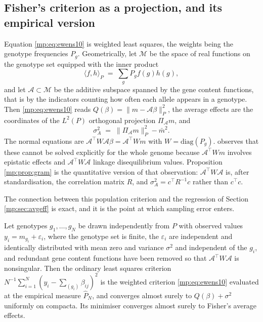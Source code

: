 \subsection{Fisher's criterion as a projection, and its empirical version}

Equation \eqref{mp:eq:ewens10} is weighted least squares, the weights being the genotype
frequencies $P_g$. Geometrically, let $\mathcal{M}$ be the space
of real functions on the genotype set equipped with the inner product
\[
\langle f,h\rangle_P \;=\; \sum_g P_g f(g) h(g),
\]
and let $\mathcal{A}\subset\mathcal{M}$ be the additive subspace spanned by the gene content
functions, that is by the indicators counting how often each allele appears in a genotype.
Then \eqref{mp:eq:ewens10} reads $Q(\beta)=\|m-\mathcal{A}\beta\|_P^2$, the average effects are
the coordinates of the $L^2(P)$ orthogonal projection $\Pi_{\mathcal{A}}m$, and
\[
\sigma_A^2 \;=\; \|\Pi_{\mathcal{A}} m\|_P^2 - \bar m^2 .
\]
The normal equations are $\mathcal{A}^\top W\mathcal{A}\beta = \mathcal{A}^\top W m$ with
$W=\mathrm{diag}(P_g)$. \citet{mp:ewens2024} observes that these cannot be solved explicitly for the
whole genome because $\mathcal{A}^\top Wm$ involves epistatic effects and $\mathcal{A}^\top W\mathcal{A}$ linkage
disequilibrium values. Proposition \ref{mp:prop:gram} is the quantitative version of that
observation: $\mathcal{A}^\top W\mathcal{A}$ is, after standardisation, the correlation matrix
$R$, and $\sigma_A^2=c^\top R^{-1}c$ rather than $c^\top c$.

\medskip
The connection between this population criterion and the regression of Section
\ref{mp:sec:avgeff} is exact, and it is the point at which sampling error enters.

\begin{proposition}
\label{mp:prop:wlsconsistency}
Let genotypes $g_1,\dots,g_N$ be drawn independently from $P$ with observed values
$y_i=m_{g_i}+\varepsilon_i$, where the genotype set is finite, the $\varepsilon_i$ are independent and identically distributed with mean zero and variance $\sigma^2$ and independent of the $g_i$, and redundant gene content functions have been removed so that $\mathcal A^\top W\mathcal A$ is nonsingular. Then the ordinary least squares criterion
$N^{-1}\sum_{i=1}^N(y_i-\sum_{(g_i)}\beta_{ij})^2$ is the weighted criterion
\eqref{mp:eq:ewens10} evaluated at the empirical measure $\hat P_N$, and converges almost surely
to $Q(\beta)+\sigma^2$ uniformly on compacta. Its minimiser converges almost surely to
Fisher's average effects.
\end{proposition}

